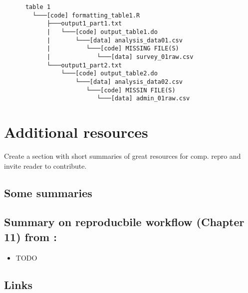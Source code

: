 \documentclass[]{book}
\providecommand{\tightlist}{%
  \setlength{\itemsep}{0pt}\setlength{\parskip}{0pt}}
\begin{document}
\begin{verbatim}
      table 1
        └───[code] formatting_table1.R
            ├───output1_part1.txt  
            |   └───[code] output_table1.do           
            |       └───[data] analysis_data01.csv
            |          └───[code] MISSING FILE(S)
            |             └───[data] survey_01raw.csv
            └───output1_part2.txt  
                └───[code] output_table2.do           
                    └───[data] analysis_data02.csv
                       └───[code] MISSIN FILE(S)
                          └───[data] admin_01raw.csv  
\end{verbatim}

\hypertarget{additional-resources}{%
\section{Additional resources}\label{additional-resources}}

Create a section with short summaries of great resources for comp. repro and invite reader to contribute.

\hypertarget{some-summaries}{%
\subsection{Some summaries}\label{some-summaries}}

\hypertarget{summary-on-reproducbile-workflow-chapter-11-from-christensen2019transparent}{%
\subsection{\texorpdfstring{Summary on reproducbile workflow (Chapter 11) from \citet{christensen2019transparent}:}{Summary on reproducbile workflow (Chapter 11) from @christensen2019transparent:}}\label{summary-on-reproducbile-workflow-chapter-11-from-christensen2019transparent}}

\begin{itemize}
\tightlist
\item
  TODO
\end{itemize}

\hypertarget{links}{%
\subsection{Links}\label{links}}
\end{document}
